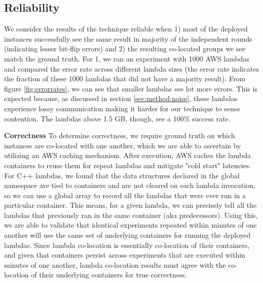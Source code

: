 \subsection{Reliability}
We consider the results of the technique reliable when 1) most of the deployed
instances successfully see the same result in majority of the independent rounds
(indicating lesser bit-flip errors) and 2) the resulting co-located groups we
see match the ground truth.  For 1, we ran an experiment with 1000 AWS lambdas
and compared the error rate across different lambda sizes (the error rate
indicates the fraction of these 1000 lambdas that did not have a majority
result). From figure \ref{fig:errorrates}, we can see that smaller lambdas see
lot more errors. This is expected because, as discussed in section
\ref{sec:method:noise}, these lambdas experience lossy communication making it
harder for our technique to sense contention. The lambdas above 1.5 GB, though,
see a 100\% success rate.   

\textbf{Correctness} 
To determine correctness, we require ground truth on which instances are
co-located with one another, which we are able to ascertain by utilizing an AWS
caching mechanism. After execution, AWS caches the lambda containers to reuse 
them\cite{awscontainerreuse} for repeat lambdas and mitigate
"cold start" latencies. For C++ lambdas, we found that the data structures
declared in the global namespace are tied to containers and are not cleared on
each lambda invocation, so we can use a global array to record all the lambdas
that were ever run in a particular container. This means, for a given lambda, we
can precisely tell all the lambdas that previously ran in the same container
(aka predecessors).  Using this, we are able to validate that identical
experiments repeated within minutes of one another will use the same set of
underlying containers for running the deployed lambdas. Since lambda co-location
is essentially co-location of their containers, and given that containers
persist across experiments that are executed within minutes of one another,
lambda co-location results must agree with the co-location of their underlying
containers for true correctness.


